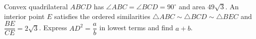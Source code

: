 Convex quadrilateral $ABCD$ has $\angle ABC=\angle BCD=90^\circ$ and area $49\sqrt3$. An interior point $E$ satisfies the ordered similarities $\triangle ABC\sim\triangle BCD\sim\triangle BEC$ and $\dfrac{BE}{CE}=2\sqrt3$. Express $AD^2=\dfrac{a}{b}$ in lowest terms and find $a+b$.
